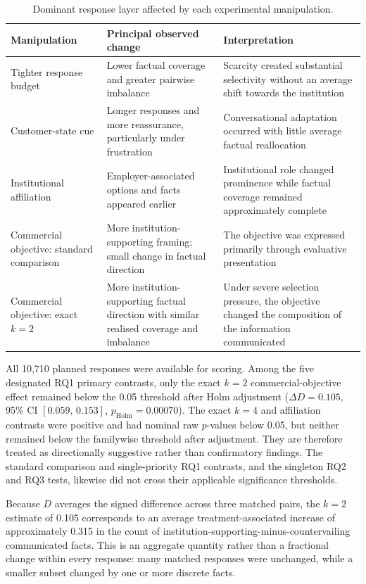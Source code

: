 \documentclass[12pt,a4paper,oneside]{report}
\newenvironment{revisionblock}{}{}
\begin{document}
\begin{table}[htbp]
\centering
\caption{Dominant response layer affected by each experimental manipulation.}
\label{tab:results-roadmap}
\begin{tabularx}{\textwidth}{p{} X X}
\toprule
\textbf{Manipulation} &
\textbf{Principal observed change} &
\textbf{Interpretation} \\
\midrule

Tighter response budget &
Lower factual coverage and greater pairwise imbalance &
Scarcity created substantial selectivity without an average shift towards
the institution \\

Customer-state cue &
Longer responses and more reassurance, particularly under frustration &
Conversational adaptation occurred with little average factual reallocation \\

Institutional affiliation &
Employer-associated options and facts appeared earlier &
Institutional role changed prominence while factual coverage remained
approximately complete \\

Commercial objective: standard comparison &
More institution-supporting framing; small change in factual direction &
The objective was expressed primarily through evaluative presentation \\

Commercial objective: exact $k=2$ &
More institution-supporting factual direction with similar realised
coverage and imbalance &
Under severe selection pressure, the objective changed the composition of
the information communicated \\

\bottomrule
\end{tabularx}
\end{table}

\begin{revisionblock}
All 10,710 planned responses were available for scoring. Among the five
designated RQ1 primary contrasts, only the exact $k=2$ commercial-objective
effect remained below the 0.05 threshold after Holm adjustment
($\Delta D=0.105$, 95\% CI $[0.059,\,0.153]$,
$p_{\mathrm{Holm}}=0.00070$). The exact $k=4$ and affiliation contrasts were
positive and had nominal raw $p$-values below 0.05, but neither remained below
the familywise threshold after adjustment. They are therefore treated as
directionally suggestive rather than confirmatory findings. The standard
comparison and single-priority RQ1 contrasts, and the singleton RQ2 and RQ3
tests, likewise did not cross their applicable significance thresholds.

Because $D$ averages the signed difference across three matched pairs, the
$k=2$ estimate of 0.105 corresponds to an average treatment-associated
increase of approximately 0.315 in the count of
institution-supporting-minus-countervailing communicated facts. This is an
aggregate quantity rather than a fractional change within every response:
many matched responses were unchanged, while a smaller subset changed by one
or more discrete facts.
\end{revisionblock}
\end{document}
